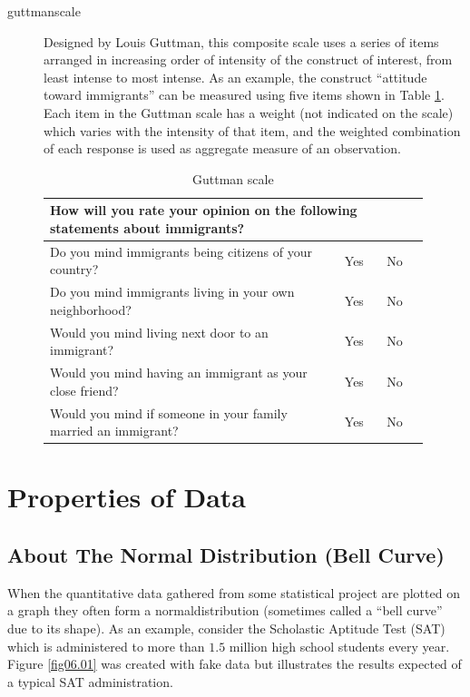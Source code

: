 \begin{description}
	\item[\Gls{guttmanscale}] Designed by Louis Guttman, this composite scale uses a series of items arranged in increasing order of intensity of the construct of interest, from least intense to most intense. As an example, the construct ``attitude toward immigrants'' can be measured using five items shown in Table \ref{tab06.05}. Each item in the Guttman scale has a weight (not indicated on the scale) which varies with the intensity of that item, and the weighted combination of each response is used as aggregate measure of an observation.
	
	\begin{table}[H]
		\centering
		\begin{tabularx}{0.95\linewidth}{p{0.70\linewidth}p{0.10\linewidth}p{0.10\linewidth}}
			\toprule
			\multicolumn{3}{p{0.95\linewidth}}{How will you rate your opinion on the following statements about immigrants?} \\	
			\midrule
			Do you mind immigrants being citizens of your country? & Yes & No \\
			Do you mind immigrants living in your own neighborhood? & Yes & No \\
			Would you mind living next door to an immigrant? & Yes & No \\
			Would you mind having an immigrant as your close friend? & Yes & No \\
			Would you mind if someone in your family married an immigrant? & Yes & No \\		
			\bottomrule
		\end{tabularx}
		\caption{Guttman scale}
		\label{tab06.05}
	\end{table}
	
\end{description}



\section{Properties of Data}

\subsection{About The Normal Distribution (Bell Curve)}

When the quantitative data gathered from some statistical project are plotted on a graph they often form a \gls{normaldistribution} (sometimes called a ``bell curve'' due to its shape). As an example, consider the Scholastic Aptitude Test (SAT) which is administered to more than $ 1.5 $ million high school students every year. Figure \ref{fig06.01} was created with fake data but illustrates the results expected of a typical SAT administration.

